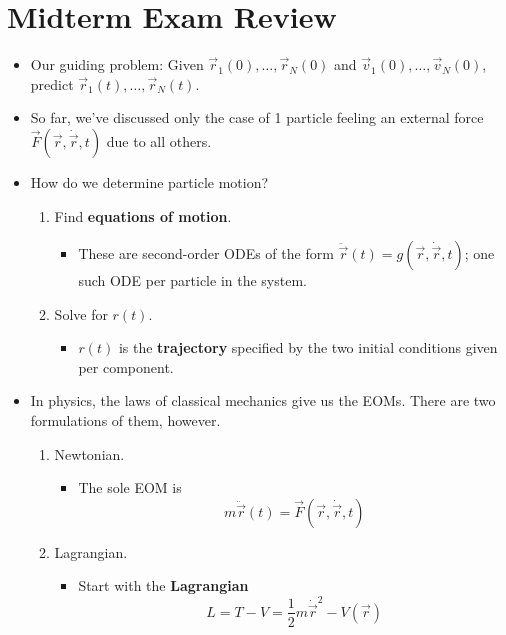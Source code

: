 \documentclass[../notes.tex]{subfiles}
\begin{document}
\section{Midterm Exam Review}
\begin{itemize}
    \item {}Our guiding problem: Given $\vec{r}_1(0),\dots,\vec{r}_N(0)$ and $\vec{v}_1(0),\dots,\vec{v}_N(0)$, predict $\vec{r}_1(t),\dots,\vec{r}_N(t)$.
    \item So far, we've discussed only the case of 1 particle feeling an external force $\vec{F}(\vec{r},\dot{\vec{r}},t)$ due to all others.
    \item How do we determine particle motion?
    \begin{enumerate}
        \item Find \textbf{equations of motion}.
        \begin{itemize}
            \item These are second-order ODEs of the form $\ddot{\vec{r}}(t)=g(\vec{r},\dot{\vec{r}},t)$; one such ODE per particle in the system.
        \end{itemize}
        \item Solve for $r(t)$.
        \begin{itemize}
            \item $r(t)$ is the \textbf{trajectory} specified by the two initial conditions given per component.
        \end{itemize}
    \end{enumerate}
    \item In physics, the laws of classical mechanics give us the EOMs. There are two formulations of them, however.
    \begin{enumerate}
        \item Newtonian.
        \begin{itemize}
            \item The sole EOM is
            \begin{equation*}
                m\ddot{\vec{r}}(t) = \vec{F}(\vec{r},\dot{\vec{r}},t)
            \end{equation*}
        \end{itemize}
        \item Lagrangian.
        \begin{itemize}
            \item Start with the \textbf{Lagrangian}
            \begin{equation*}
                L = T-V = \frac{1}{2}m\dot{\vec{r}}^2-V(\vec{r})

\end{equation*}
\end{itemize}
\end{enumerate}
\end{itemize}
\end{document}
